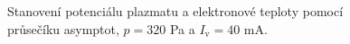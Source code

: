 \documentclass[a4paper,12pt]{article}
\begin{document}
\begin{figure}[h]
	\centering
	\begin{subfigure}[b]{.49\textwidth}
		\centering
	\end{subfigure}
	\begin{subfigure}[b]{.49\textwidth}
		\centering
	\end{subfigure}
	\caption{Stanovení potenciálu plazmatu a elektronové teploty pomocí 
		průsečíku asymptot, $p = 320$ \si{\pascal} a $I_\text{v} = 40$ 
		\si{\milli\ampere}.}
	\label{data3}
\end{figure}
\end{document}
